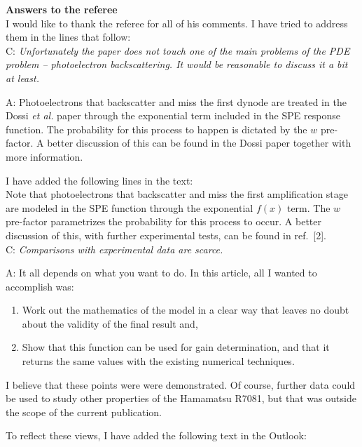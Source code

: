 \documentclass[a4paper,11pt]{article}
\begin{document}
{\bf Answers to the referee}
\\[1ex]

I would like to thank the referee for all of his comments. 
I have tried to address them in the lines that follow: 
\\[1ex]

C: \emph{Unfortunately the paper does not touch one of the main problems of the PDE problem -- photoelectron backscattering. It would be reasonable to discuss it a bit at least.}

A: Photoelectrons that backscatter and miss the first dynode are treated in the Dossi \emph{et al.} paper through the exponential term included in the SPE response function.  
The probability for this process to happen is dictated by the $w$ pre-factor. A better discussion of this can be found in the Dossi paper together with more information.

I have added the following lines in the text:
\\[1ex]

Note that photoelectrons that backscatter and miss the first amplification stage are modeled in the SPE function through the exponential $f(x)$ term. 
The $w$ pre-factor parametrizes the probability for this process to occur. A better discussion of this, with further experimental tests, can be found in ref.~[2]. 
\\[1ex]

C: \emph{Comparisons with experimental data are scarce.}

A: It all depends on what you want to do. In this article, all I wanted to accomplish was:
\begin{enumerate}
\item Work out the mathematics of the model in a clear way that leaves no doubt about the validity of the final result and,
\item Show that this function can be used for gain determination, and that it returns the same values with the existing numerical techniques.
\end{enumerate}
I believe that these points were were demonstrated. 
Of course, further data could be used to study other properties of the Hamamatsu R7081, but that was outside the scope of the current publication. 

To reflect these views, I have added the following text in the Outlook:
\\[1ex]
\end{document}
